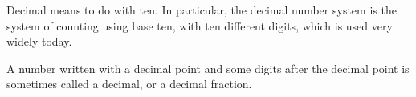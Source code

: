 Decimal means to do with ten. In particular, the decimal number system is the 
system of counting using base ten, with ten different digits, which is used 
very widely today.
\par
A number written with a decimal point and some digits after the decimal point
is sometimes called a decimal, or a decimal fraction.
